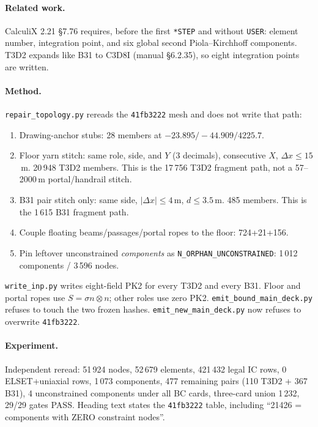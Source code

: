 \documentclass[11pt,a4paper]{article}
\begin{document}
\paragraph{Related work.}
CalculiX 2.21 \S7.76 requires, before the first \texttt{*STEP} and without
\texttt{USER}: element number, integration point, and six global second
Piola--Kirchhoff components. T3D2 expands like B31 to C3D8I (manual
\S6.2.35), so eight integration points are written.

\paragraph{Method.}
\texttt{repair\_topology.py} rereads the \texttt{41fb3222} mesh and does not
write that path:
\begin{enumerate}
\item Drawing-anchor stubs: 28 members at \(-23.895/-44.909/4225.7\).
\item Floor yarn stitch: same role, side, and \(Y\) (3 decimals), consecutive
\(X\), \(\Delta x\le 15\)\,m. 20\,948 T3D2 members. This is the 17\,756 T3D2
fragment path, not a 57--2000\,m portal/handrail stitch.
\item B31 pair stitch only: same side, \(|\Delta x|\le 4\)\,m, \(d\le 3.5\)\,m.
485 members. This is the 1\,615 B31 fragment path.
\item Couple floating beams/passages/portal ropes to the floor:
724+21+156.
\item Pin leftover unconstrained \emph{components} as
\texttt{N\_ORPHAN\_UNCONSTRAINED}: 1\,012 components / 3\,596 nodes.
\end{enumerate}
\texttt{write\_inp.py} writes eight-field PK2 for every T3D2 and every B31.
Floor and portal ropes use \(S=\sigma n\otimes n\); other roles use zero PK2.
\texttt{emit\_bound\_main\_deck.py} refuses to touch the two frozen hashes.
\texttt{emit\_new\_main\_deck.py} now refuses to overwrite \texttt{41fb3222}.

\paragraph{Experiment.}
Independent reread: 51\,924 nodes, 52\,679 elements, 421\,432 legal IC rows,
0 ELSET+uniaxial rows, 1\,073 components, 477 remaining pairs
(110 T3D2 + 367 B31), 4 unconstrained components under all BC cards,
three-card union 1\,232, 29/29 gates PASS. Heading text states the
\texttt{41fb3222} table, including ``21426 = components with ZERO constraint
nodes''.
\end{document}
